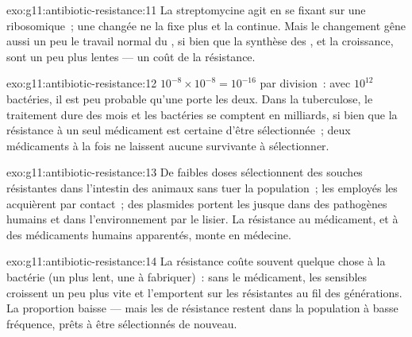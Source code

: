 \begin{solution}{exo:g11:antibiotic-resistance:11}
La streptomycine agit en se fixant sur une  ribosomique~; une
 changée ne la fixe plus et la  continue. Mais le
changement gêne aussi un peu le travail normal du , si bien que
la synthèse des , et la croissance, sont un peu plus lentes
--- un coût de la résistance.
\end{solution}

\begin{solution}{exo:g11:antibiotic-resistance:12}
$10^{-8} \times 10^{-8} = 10^{-16}$ par division~: avec $10^{12}$
bactéries, il est peu probable qu'une  porte les deux. Dans la
tuberculose, le traitement dure des mois et les bactéries se comptent
en milliards, si bien que la résistance à un seul médicament est
certaine d'être sélectionnée~; deux médicaments à la fois ne laissent
aucune survivante à sélectionner.
\end{solution}

\begin{solution}{exo:g11:antibiotic-resistance:13}
De faibles doses sélectionnent des souches résistantes dans l'intestin
des animaux sans tuer la population~; les employés les acquièrent par
contact~; des plasmides portent les  jusque dans des pathogènes
humains et dans l'environnement par le lisier. La résistance au
médicament, et à des médicaments humains apparentés, monte en médecine.
\end{solution}

\begin{solution}{exo:g11:antibiotic-resistance:14}
La résistance coûte souvent quelque chose à la bactérie (un 
plus lent, une  à fabriquer)~: sans le médicament, les 
sensibles croissent un peu plus vite et l'emportent sur les résistantes
au fil des générations. La proportion baisse --- mais les  de
résistance restent dans la population à basse fréquence, prêts à être
sélectionnés de nouveau.
\end{solution}

